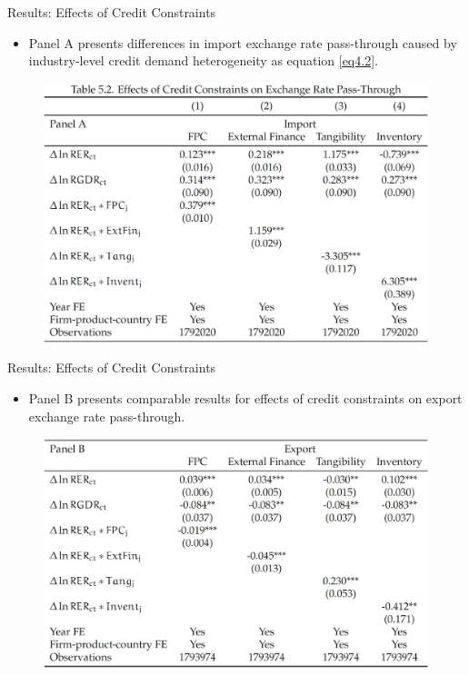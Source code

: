 \documentclass[10pt]{beamer}
\begin{document}
\begin{frame}{Results: Effects of Credit Constraints}
	\begin{itemize}
		\item Panel A presents differences in import exchange rate pass-through caused by industry-level credit demand heterogeneity as equation \ref{eq4.2}.
	\end{itemize}
	\begin{figure}[htbp]
		\centering
		\includegraphics[width=0.8\columnwidth]{Table5.2A.jpg}
		\label{tab5.2A}
	\end{figure}
\end{frame}

\begin{frame}{Results: Effects of Credit Constraints}
	\begin{itemize}
		\item Panel B presents comparable results for effects of credit constraints on export exchange rate pass-through.
	\end{itemize}
	\begin{figure}[htbp]
		\centering
		\includegraphics[width=0.8\columnwidth]{Table5.2B.jpg}
		\label{tab5.2B}
	\end{figure}
\end{frame}
\end{document}
